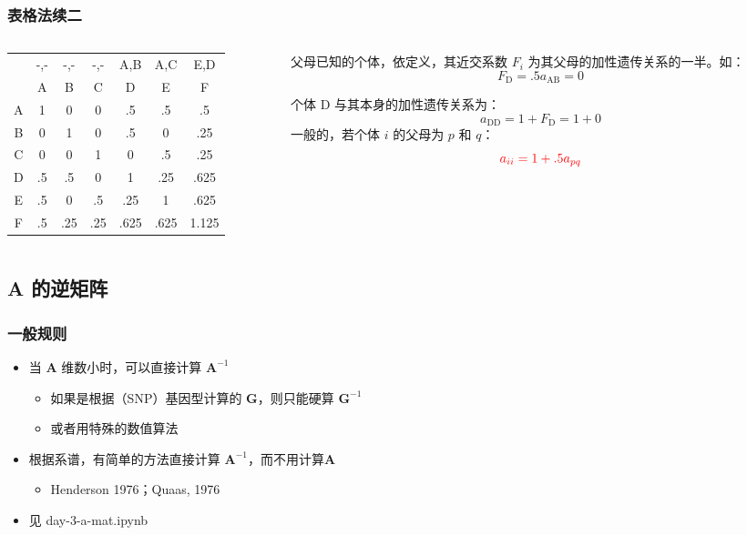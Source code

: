\documentclass[serif,aspectratio=169]{beamer}
\begin{document}
\begin{frame}
  \frametitle{表格法\tiny{续二}}
  \begin{columns}
    \begin{column}{.5\textwidth}
      \centering
      \begin{tabular}{c|ccc|ccc}
        & -,- & -,- & -,- & A,B & A,C & E,D\\
        & A & B & C & D & E & F\\\hline
        A & 1 & 0 & 0 & .5 & .5 & .5\\
        B & 0 & 1 & 0 & .5 & 0 & .25\\
        C & 0 & 0 & 1 & 0 & .5 & .25\\\hline
        D & .5 & .5 & 0 & 1 & .25 & .625\\
        E & .5 & 0 & .5 & .25 & 1 & .625\\
        F & .5 & .25 & .25 & .625 & .625 & 1.125
      \end{tabular}
    \end{column}

    \begin{column}{.5\textwidth}
      父母已知的个体，依定义，其近交系数 $F_i$ 为其父母的加性遗传关系的一半。如：
      $$F_{\mathrm{D}} = .5a_{\mathrm{AB}} = 0$$

      个体 D 与其本身的加性遗传关系为：
      $$a_{\mathrm{DD}} = 1+F_{\mathrm{D}} = 1+0$$
      一般的，若个体 $i$ 的父母为 $p$ 和 $q$：
      $$\color{red}a_{ii} = 1+.5a_{pq}$$
    \end{column}
  \end{columns}
\end{frame}


\subsection{A 的逆矩阵}
\begin{frame}
  \frametitle{一般规则}
  \begin{itemize}
  \item 当 $\mathbf{A}$ 维数小时，可以直接计算 $\mathbf{A}^{-1}$
    \begin{itemize}
    \item 如果是根据（SNP）基因型计算的 $\mathbf{G}$，则只能硬算 $\mathbf{G}^{-1}$
    \item 或者用特殊的数值算法
    \end{itemize}
  \item 根据系谱，有简单的方法直接计算 $\mathbf{A}^{-1}$，而不用计算$\mathbf{A}$
    \begin{itemize}
    \item Henderson 1976；Quaas, 1976
    \end{itemize}
  \item 见 {\color{cyan}day-3-a-mat.ipynb}
  \end{itemize}
\end{frame}
\end{document}
